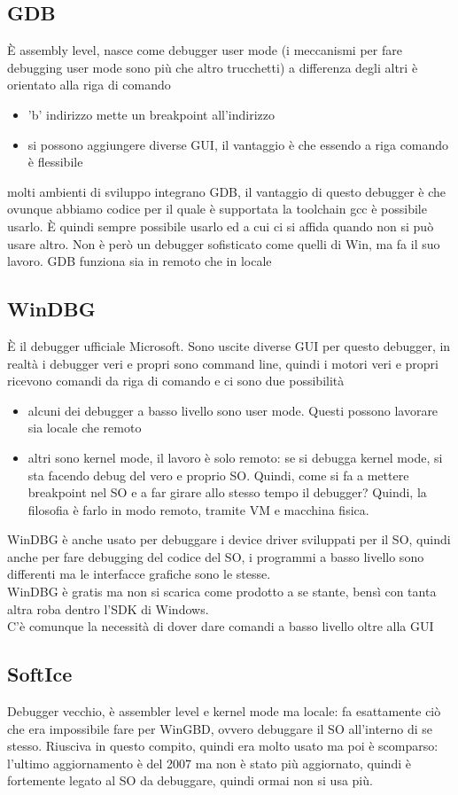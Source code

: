 \documentclass[12pt, oneside]{extbook}
\begin{document}
\subsection{GDB}
È assembly level, nasce come debugger user mode (i meccanismi per fare debugging user mode sono più che altro trucchetti) a differenza degli altri è orientato alla riga di comando
\begin{itemize}
\item 'b' indirizzo mette un breakpoint all'indirizzo
\item si possono aggiungere diverse GUI, il vantaggio è che essendo a riga comando è flessibile
\end{itemize}
molti ambienti di sviluppo integrano GDB, il vantaggio di questo debugger è che ovunque abbiamo codice per il quale è supportata la toolchain gcc è possibile usarlo. È quindi sempre possibile usarlo ed a cui ci si affida quando non si può usare altro. Non è però un debugger sofisticato come quelli di Win, ma fa il suo lavoro. GDB funziona sia in remoto che in locale
\subsection{WinDBG}
È il debugger ufficiale Microsoft. Sono uscite diverse GUI per questo debugger, in realtà i debugger veri e propri sono command line, quindi i motori veri e propri ricevono comandi da riga di comando e ci sono due possibilità
\begin{itemize}
\item alcuni dei debugger a basso livello sono user mode. Questi possono lavorare sia locale che remoto
\item altri sono kernel mode, il lavoro è solo remoto: se si debugga kernel mode, si sta facendo debug del vero e proprio SO. Quindi, come si fa a mettere breakpoint nel SO e a far girare allo stesso tempo il debugger? Quindi, la filosofia è farlo in modo remoto, tramite VM e macchina fisica.
\end{itemize}
WinDBG è anche usato per debuggare i device driver sviluppati per il SO, quindi anche per fare debugging del codice del SO, i programmi a basso livello sono differenti ma le interfacce grafiche sono le stesse.\\ WinDBG è gratis ma non si scarica come prodotto a se stante, bensì con tanta altra roba dentro l'SDK di Windows.\\ C'è comunque la necessità di dover dare comandi a basso livello oltre alla GUI
\subsection{SoftIce}
Debugger vecchio, è assembler level e kernel mode ma locale: fa esattamente ciò che era impossibile fare per WinGBD, ovvero debuggare il SO all'interno di se stesso. Riusciva in questo compito, quindi era molto usato ma poi è scomparso: l'ultimo aggiornamento è del 2007 ma non è stato più aggiornato, quindi è fortemente legato al SO da debuggare, quindi ormai non si usa più.
\end{document}
